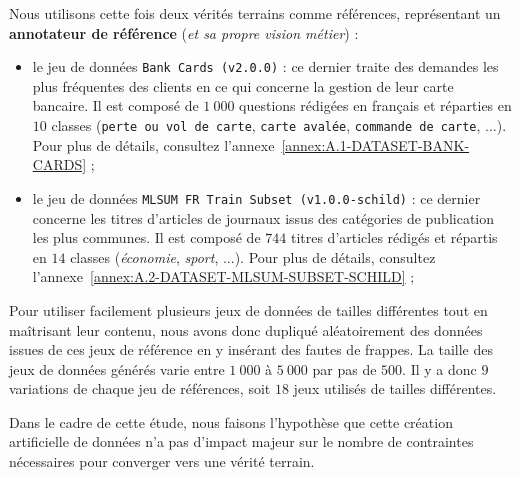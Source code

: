 			Nous utilisons cette fois deux vérités terrains comme références, représentant un \textbf{annotateur de référence} (\textit{et sa propre vision métier}) :
			\begin{itemize}
				\item le jeu de données \texttt{Bank Cards (v2.0.0)} : ce dernier traite des demandes les plus fréquentes des clients en ce qui concerne la gestion de leur carte bancaire. Il est composé de $1~000$ questions rédigées en français et réparties en $10$ classes (\texttt{perte ou vol de carte}, \texttt{carte avalée}, \texttt{commande de carte}, ...). Pour plus de détails, consultez l'annexe~\ref{annex:A.1-DATASET-BANK-CARDS} ;
				\item le jeu de données \texttt{MLSUM FR Train Subset (v1.0.0-schild)} : ce dernier concerne les titres d'articles de journaux issus des catégories de publication les plus communes. Il est composé de $744$  titres d'articles rédigés et répartis en $14$ classes (\textit{économie}, \textit{sport}, ...). Pour plus de détails, consultez l'annexe~\ref{annex:A.2-DATASET-MLSUM-SUBSET-SCHILD} ;
			\end{itemize}
			
			Pour utiliser facilement plusieurs jeux de données de tailles différentes tout en maîtrisant leur contenu, nous avons donc dupliqué aléatoirement des données issues de ces jeux de référence en y insérant des fautes de frappes.
			La taille des jeux de données générés varie entre $1~000$ à $5~000$ par pas de $500$.
			Il y a donc $9$ variations de chaque jeu de références, soit $18$ jeux utilisés de tailles différentes.
			
			\begin{leftBarWarning}
				Dans le cadre de cette étude, nous faisons l'hypothèse que cette création artificielle de données n'a pas d'impact majeur sur le nombre de contraintes nécessaires pour converger vers une vérité terrain.
			\end{leftBarWarning}
			
